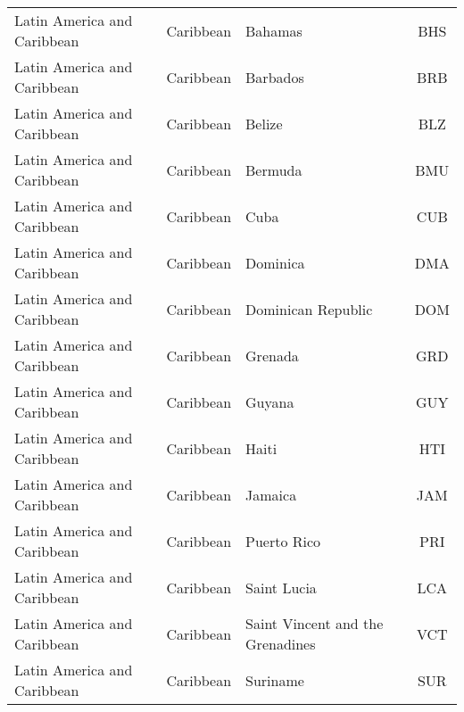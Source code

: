 \begin{landscape}
\begin{longtable}{|p{6cm}|c|p{5cm}|c|}
                      Latin America and Caribbean &                    Caribbean &                                           Bahamas &  BHS \\
                      Latin America and Caribbean &                    Caribbean &                                          Barbados &  BRB \\
                      Latin America and Caribbean &                    Caribbean &                                            Belize &  BLZ \\
                      Latin America and Caribbean &                    Caribbean &                                           Bermuda &  BMU \\
                      Latin America and Caribbean &                    Caribbean &                                              Cuba &  CUB \\
                      Latin America and Caribbean &                    Caribbean &                                          Dominica &  DMA \\
                      Latin America and Caribbean &                    Caribbean &                                Dominican Republic &  DOM \\
                      Latin America and Caribbean &                    Caribbean &                                           Grenada &  GRD \\
                      Latin America and Caribbean &                    Caribbean &                                            Guyana &  GUY \\
                      Latin America and Caribbean &                    Caribbean &                                             Haiti &  HTI \\
                      Latin America and Caribbean &                    Caribbean &                                           Jamaica &  JAM \\
                      Latin America and Caribbean &                    Caribbean &                                       Puerto Rico &  PRI \\
                      Latin America and Caribbean &                    Caribbean &                                       Saint Lucia &  LCA \\
                      Latin America and Caribbean &                    Caribbean &            \raggedright Saint Vincent and the Grenadines &  VCT \\
                      Latin America and Caribbean &                    Caribbean &                                          Suriname &  SUR \\

\end{longtable}
\end{landscape}
